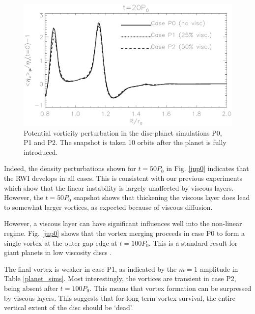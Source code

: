 \begin{figure}
  \centering
  \includegraphics[width=\linewidth]{figures/pdisk_vorten1d_cases_002.ps}
  \caption{Potential vorticity perturbation in the disc-planet
    simulations P0, P1 and P2. The snapshot is taken 10 orbits after
    the planet is fully introduced. %
    \label{planet_gap}}
\end{figure}

Indeed, the density perturbations shown for $t=50P_0$ in
Fig. \ref{jup0} indicates that the RWI develops in all cases. This is
consistent with our previous experiments which show that the linear
instability is largely unaffected by viscous layers. However,   
the $t=50P_0$ snapshot shows that thickening the viscous layer does lead
to somewhat larger vortices, as expected because of viscous diffusion.   

However, a viscous layer can have significant influences  
well into the non-linear regime. Fig. \ref{jup0} shows that the vortex
merging proceeds in case P0 to form a single vortex at the outer gap
edge at $t=100P_0$. This is a standard result for giant planets in
low viscosity discs \citep{valborro06,valborro07}.  

The final vortex is weaker 
in case P1, as indicated by the $m=1$ amplitude in Table
\ref{planet_sims}. Most interestingly, the vortices are transient in case P2,
being absent after $t=100P_0$. This means that vortex formation can be
surpressed by viscous layers. This suggests that for long-term vortex
survival, the entire vertical extent of the disc should be `dead'. 

